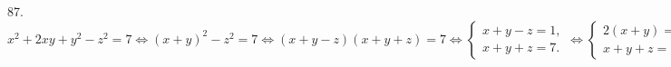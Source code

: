 87. $x^2+2xy+y^2-z^2=7\Leftrightarrow (x+y)^2-z^2=7\Leftrightarrow (x+y-z)(x+y+z)=7\Leftrightarrow \begin{cases} x+y-z=1,\\ x+y+z=7.\end{cases}
\Leftrightarrow \begin{cases} 2(x+y)=8,\\ x+y+z=7.\end{cases}
\Leftrightarrow \begin{cases} x+y=4,\\ z=3.\end{cases}\Rightarrow
(x;y;z)\in \{(1;3;3),(3;1;3),(2;2;3)\}.$
